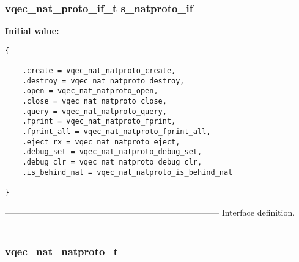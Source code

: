 \subsubsection{\setlength{\rightskip}{0pt plus 5cm}vqec\_\-nat\_\-proto\_\-if\_\-t \bf{s\_\-natproto\_\-if}\hspace{0.3cm}{\tt  [static]}}\label{vqec__nat__natproto_8c_bda64e35ed7738ddfe563e4e0acbb7cb}


\textbf{Initial value:}

\begin{Code}\begin{verbatim} 
{

    .create = vqec_nat_natproto_create,
    .destroy = vqec_nat_natproto_destroy,
    .open = vqec_nat_natproto_open,
    .close = vqec_nat_natproto_close,
    .query = vqec_nat_natproto_query,
    .fprint = vqec_nat_natproto_fprint,
    .fprint_all = vqec_nat_natproto_fprint_all,
    .eject_rx = vqec_nat_natproto_eject,
    .debug_set = vqec_nat_natproto_debug_set,
    .debug_clr = vqec_nat_natproto_debug_clr,
    .is_behind_nat = vqec_nat_natproto_is_behind_nat

}
\end{verbatim}\end{Code}
--------------------------------------------------------------------------- Interface definition. --------------------------------------------------------------------------- 
\subsubsection{\setlength{\rightskip}{0pt plus 5cm}\bf{vqec\_\-nat\_\-natproto\_\-t}}\label{vqec__nat__natproto_8c_135f99105c4acba2d47cee73c9f96579}


